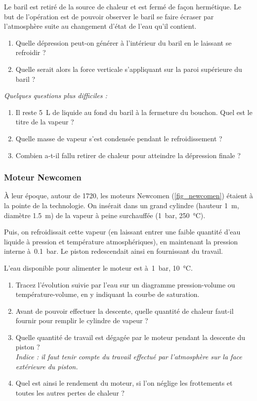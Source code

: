 	Le baril est retiré de la source de chaleur et est fermé de façon hermétique. Le but de l’opération est de pouvoir observer le baril se faire écraser par l’atmosphère suite au changement d’état de l’eau qu’il contient.

	\begin{enumerate}
		\item Quelle dépression peut-on générer à l’intérieur du baril en le laissant se refroidir ? 
		\item Quelle serait alors la force verticale s’appliquant sur la paroi supérieure du baril ?
	\end{enumerate}
	
	\textit{Quelques questions plus difficiles :}
		
	\begin{enumerate}
		\item Il reste \SI{5}{\liter} de liquide au fond du baril à la fermeture du bouchon. Quel est le titre de la vapeur ?
		\item Quelle masse de vapeur s’est condensée pendant le refroidissement ?
		\item Combien a-t-il fallu retirer de chaleur pour atteindre la dépression finale ?
	\end{enumerate}

\subsubsection{Moteur Newcomen}
\label{exo_moteur_newcomen}

	À leur époque, autour de 1720, les moteurs Newcomen (\cref{fig_newcomen}) étaient à la pointe de la technologie. On insérait dans un grand cylindre (hauteur \SI{1}{\metre}, diamètre \SI{1.5}{\metre}) de la vapeur à peine surchauffée (\SI{1}{\bar}, \SI{250}{\degreeCelsius}).
	
	Puis, on refroidissait cette vapeur (en laissant entrer une faible quantité d’eau liquide à pression et température atmosphériques), en maintenant la pression interne à~\SI{0,1}{\bar}. Le piston redescendait ainsi en fournissant du travail.
	
	L’eau disponible pour alimenter le moteur est à~\SI{1}{\bar}, \SI{10}{\degreeCelsius}.
	
	\begin{enumerate}
		\item Tracez l’évolution suivie par l’eau sur un diagramme pression-volume ou température-volume, en y indiquant la courbe de saturation.
		\item Avant de pouvoir effectuer la descente, quelle quantité de chaleur faut-il fournir pour remplir le cylindre de vapeur ?
		\item Quelle quantité de travail est dégagée par le moteur pendant la descente du piston ?\\
				\textit{Indice : il faut tenir compte du travail effectué par l’atmosphère sur la face extérieure du piston.}
		\item Quel est ainsi le rendement du moteur, si l’on néglige les frottements et toutes les autres pertes de chaleur ?
	\end{enumerate}

